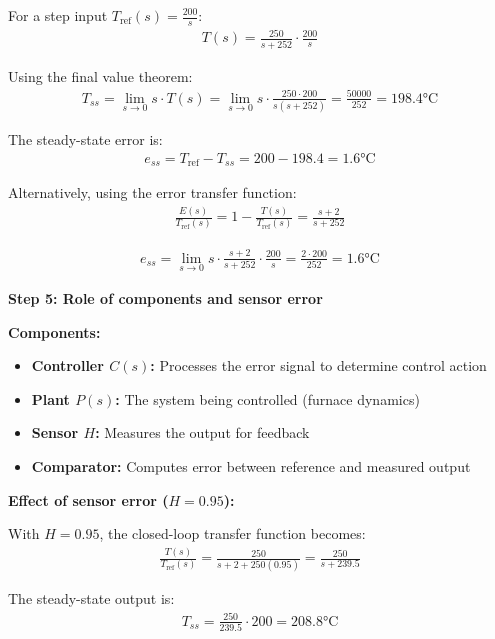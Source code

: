 \documentclass[11pt,a4paper]{article}
\begin{document}
For a step input $T_{\text{ref}}(s) = \frac{200}{s}$:
\begin{align}
T(s) = \frac{250}{s+252} \cdot \frac{200}{s}
\end{align}

Using the final value theorem:
\begin{align}
T_{ss} = \lim_{s \to 0} s \cdot T(s) = \lim_{s \to 0} s \cdot \frac{250 \cdot 200}{s(s+252)} = \frac{50000}{252} = 198.4 \text{°C}
\end{align}

The steady-state error is:
\begin{align}
e_{ss} = T_{\text{ref}} - T_{ss} = 200 - 198.4 = 1.6 \text{°C}
\end{align}

Alternatively, using the error transfer function:
\begin{align}
\frac{E(s)}{T_{\text{ref}}(s)} = 1 - \frac{T(s)}{T_{\text{ref}}(s)} = \frac{s+2}{s+252}
\end{align}

\begin{align}
e_{ss} = \lim_{s \to 0} s \cdot \frac{s+2}{s+252} \cdot \frac{200}{s} = \frac{2 \cdot 200}{252} = 1.6 \text{°C}
\end{align}

\textbf{Step 5: Role of components and sensor error}

\textbf{Components:}
\begin{itemize}
\item \textbf{Controller $C(s)$:} Processes the error signal to determine control action
\item \textbf{Plant $P(s)$:} The system being controlled (furnace dynamics)
\item \textbf{Sensor $H$:} Measures the output for feedback
\item \textbf{Comparator:} Computes error between reference and measured output
\end{itemize}

\textbf{Effect of sensor error ($H = 0.95$):}

With $H = 0.95$, the closed-loop transfer function becomes:
\begin{align}
\frac{T(s)}{T_{\text{ref}}(s)} = \frac{250}{s + 2 + 250(0.95)} = \frac{250}{s + 239.5}
\end{align}

The steady-state output is:
\begin{align}
T_{ss} = \frac{250}{239.5} \cdot 200 = 208.8 \text{°C}
\end{align}
\end{document}
